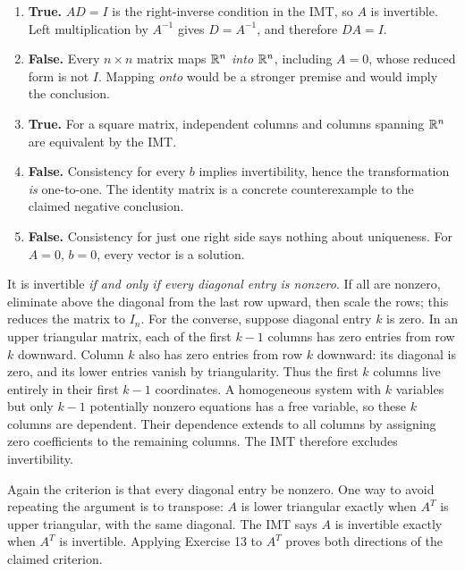\begin{enumerate}[label=(\alph*)]
\item \textbf{True.} $AD=I$ is the right-inverse condition in the IMT,
so $A$ is invertible. Left multiplication by $A^{-1}$ gives $D=A^{-1}$,
and therefore $DA=I$.
\item \textbf{False.} Every $n\times n$ matrix maps $\mathbb{R}^n$ \emph{into}
$\mathbb{R}^n$, including $A=0$, whose reduced form is not $I$.
Mapping \emph{onto} would be a stronger premise and would imply the conclusion.
\item \textbf{True.} For a square matrix, independent columns and
columns spanning $\mathbb{R}^n$ are equivalent by the IMT.
\item \textbf{False.} Consistency for every $b$ implies invertibility,
hence the transformation \emph{is} one-to-one. The identity matrix is a
concrete counterexample to the claimed negative conclusion.
\item \textbf{False.} Consistency for just one right side says nothing
about uniqueness. For $A=0$, $b=0$, every vector is a solution.
\end{enumerate}

It is invertible \emph{if and only if every diagonal entry is nonzero}.
If all are nonzero, eliminate above the diagonal from the last row upward,
then scale the rows; this reduces the matrix to $I_n$.
For the converse, suppose diagonal entry $k$ is zero. In an upper
triangular matrix, each of the first $k-1$ columns has zero entries from
row $k$ downward. Column $k$ also has zero entries from row $k$ downward:
its diagonal is zero, and its lower entries vanish by triangularity.
Thus the first $k$ columns live entirely in their first $k-1$ coordinates.
A homogeneous system with $k$ variables but only $k-1$ potentially
nonzero equations has a free variable, so these $k$ columns are dependent.
Their dependence extends to all columns by assigning zero coefficients
to the remaining columns. The IMT therefore excludes invertibility.

Again the criterion is that every diagonal entry be nonzero.
One way to avoid repeating the argument is to transpose: $A$ is lower
triangular exactly when $A^T$ is upper triangular, with the same diagonal.
The IMT says $A$ is invertible exactly when $A^T$ is invertible.
Applying Exercise 13 to $A^T$ proves both directions of the claimed criterion.

